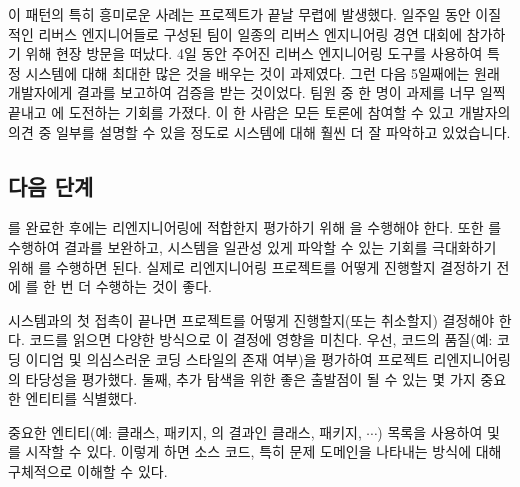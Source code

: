 \documentclass[a4paper,10pt,twoside]{book}
\begin{document}
이 패턴의 특히 흥미로운 사례는  프로젝트가 끝날 무렵에 발생했다. 일주일 동안 이질적인 리버스 엔지니어들로 구성된 팀이 일종의 리버스 엔지니어링 경연 대회에 참가하기 위해 현장 방문을 떠났다. 4일 동안 주어진 리버스 엔지니어링 도구를 사용하여 특정  시스템에 대해 최대한 많은 것을 배우는 것이 과제였다. 그런 다음 5일째에는 원래 개발자에게 결과를 보고하여 검증을 받는 것이었다. 팀원 중 한 명이 과제를 너무 일찍 끝내고 에 도전하는 기회를 가졌다. 이 한 사람은 모든 토론에 참여할 수 있고 개발자의 의견 중 일부를 설명할 수 있을 정도로 시스템에 대해 훨씬 더 잘 파악하고 있었습니다.

\subsection*{다음 단계}

를 완료한 후에는 리엔지니어링에 적합한지 평가하기 위해 을 수행해야 한다. 또한 를 수행하여 결과를 보완하고, 시스템을 일관성 있게 파악할 수 있는 기회를 극대화하기 위해 를 수행하면 된다. 실제로 리엔지니어링 프로젝트를 어떻게 진행할지 결정하기 전에 를 한 번 더 수행하는 것이 좋다.

시스템과의 첫 접촉이 끝나면 프로젝트를 어떻게 진행할지(또는 취소할지) 결정해야 한다. 코드를 읽으면 다양한 방식으로 이 결정에 영향을 미친다. 우선, 코드의 품질(예: 코딩 이디엄 및 의심스러운 코딩 스타일의 존재 여부)을 평가하여 프로젝트 리엔지니어링의 타당성을 평가했다. 둘째, 추가 탐색을 위한 좋은 출발점이 될 수 있는 몇 가지 중요한 엔티티를 식별했다. 

중요한 엔티티(예: 클래스, 패키지, 의 결과인 클래스, 패키지, $\cdots$) 목록을 사용하여  및 를 시작할 수 있다. 이렇게 하면 소스 코드, 특히 문제 도메인을 나타내는 방식에 대해 구체적으로 이해할 수 있다.


\end{document}
